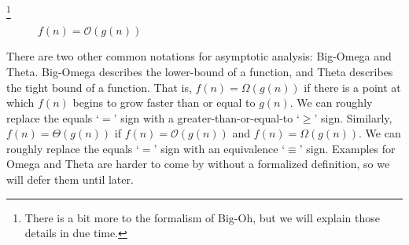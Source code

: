 \footnote{There is a bit more to the formalism of Big-Oh, but we will explain those details in due time.}
\begin{figure}[H]
  \centering
  \caption{$f(n) = \mathcal{O}(g(n))$}
  \end{figure}

There are two other common notations for asymptotic analysis: Big-Omega and Theta. Big-Omega describes the lower-bound of a function, and Theta describes the tight bound of a function. That is, $f(n) = \Omega(g(n))$ if there is a point at which $f(n)$ begins to grow faster than or equal to $g(n)$. We can roughly replace the equals `$=$' sign with a greater-than-or-equal-to `$\geq$' sign. Similarly, $f(n) = \Theta(g(n))$ if $f(n) = \mathcal{O}(g(n))$ and $f(n) = \Omega(g(n))$. We can roughly replace the equals `$=$' sign with an equivalence `$\equiv$' sign. Examples for Omega and Theta are harder to come by without a formalized definition, so we will defer them until later.

